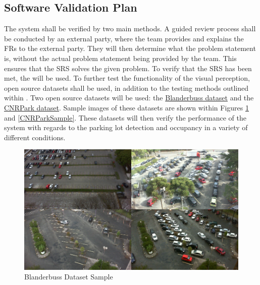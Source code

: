 \documentclass[12pt, titlepage]{article}
\begin{document}
\subsection{Software Validation Plan}

The system shall be verified by two main methods. A guided review process shall be conducted by an external party, where the team provides and explains the FRs to the external party. They will then determine what the problem statement is, without the actual problem statement being provided by the team. This ensures that the SRS solves the given problem. To verify that the SRS has been met, the  will be used. To further test the functionality of the visual perception, open source datasets shall be used, in addition to the testing methods outlined within . Two open source datasets will be used: the \href{https://www.kaggle.com/datasets/blanderbuss/parking-lot-dataset}{Blanderbuss dataset} and the \href{http://cnrpark.it/}{CNRPark dataset}. Sample images of these datasets are shown within Figures \ref{BlanderbussSample} and \ref{CNRParkSample}. These datasets will then verify the performance of the system with regards to the parking lot detection and occupancy in a variety of different conditions.  

\begin{figure}[h!]
  \begin{center} 
  \caption{Blanderbuss Dataset Sample}
  \label{BlanderbussSample}
        \includegraphics[width=1\textwidth]{VnVPlan/BlanderbussDataset.png}
  \end{center}
\end{figure}
\end{document}
